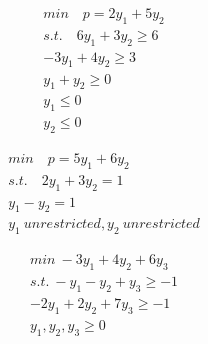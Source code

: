 \documentclass[12pt,english]{article}
\begin{document}
\begin{eqnarray*}
    min \quad p = 2y_1 + 5y_2\\
    s.t. \quad 6y_1 + 3y_2 \geq 6\\
    -3y_1 + 4y_2 \geq 3 \\
    y_1 + y_2 \geq 0 \\
    y_1 \leq 0\\
    y_2 \leq 0 
\end{eqnarray*}
    
\begin{eqnarray*}
    min \quad p = 5y_1 + 6y_2 \\
    s.t. \quad 2y_1 + 3y_2 = 1\\
    y_1 - y_2 = 1\\
    y_1 \ unrestricted, y_2 \ unrestricted
\end{eqnarray*}

\begin{eqnarray*}
    min \ -3y_1+4y_2+6y_3 \\
    s.t. \ -y_1 -y_2+y_3\geq -1\\
    -2y_1 + 2y_2 + 7y_3 \geq -1\\
    y_1, y_2, y_3 \geq 0
\end{eqnarray*}
\end{document}
